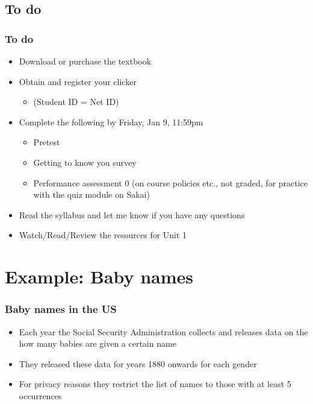 \documentclass[11pt,containsverbatim,handout,xcolor=xelatex,dvipsnames,table]{beamer}
\begin{document}

\subsection{To do}


\begin{frame}
\frametitle{To do}

\begin{itemize}

\item Download or purchase the textbook

\item Obtain and register your clicker
\begin{itemize}
\item {} (Student ID = Net ID)
\end{itemize}

\item Complete the following by Friday, Jan 9, 11:59pm
\begin{itemize}
\item Pretest
\item Getting to know you survey
\item Performance assessment 0 (on course policies etc., not graded, for practice with the quiz module on Sakai)
\end{itemize}

\item Read the syllabus and let me know if you have any questions

\item Watch/Read/Review the resources for Unit 1

\end{itemize}

\end{frame}


\section{Example: Baby names}


\begin{frame}
\frametitle{Baby names in the US}

\begin{itemize}

\item Each year the Social Security Administration collects and releases data on the how many babies are given a certain name

\item They released these data for years 1880 onwards for each gender

\item For privacy reasons they restrict the list of names to those with at least 5 occurrences

\end{itemize}

\end{frame}
\end{document}
